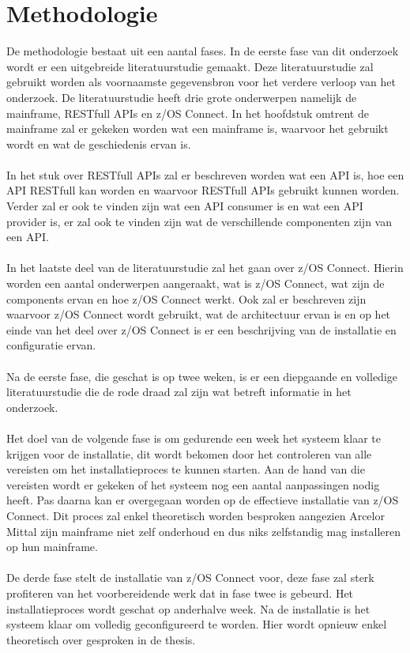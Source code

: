 \section{Methodologie}%
\label{sec:methodologie}
De methodologie bestaat uit een aantal fases. In de eerste fase van dit onderzoek wordt er een uitgebreide literatuurstudie gemaakt. Deze literatuurstudie zal gebruikt worden als voornaamste gegevensbron voor het verdere verloop van het onderzoek. De literatuurstudie heeft drie grote onderwerpen namelijk de mainframe, RESTfull APIs en z/OS Connect. In het hoofdstuk omtrent de mainframe zal er gekeken worden wat een mainframe is, waarvoor het gebruikt wordt en wat de geschiedenis ervan is.
\\ \\
In het stuk over RESTfull APIs zal er beschreven worden wat een API is, hoe een API RESTfull kan worden en waarvoor RESTfull APIs gebruikt kunnen worden. Verder zal er ook te vinden zijn wat een API consumer is en wat een API provider is, er zal ook te vinden zijn wat de verschillende componenten zijn van een API.
\\ \\
In het laatste deel van de literatuurstudie zal het gaan over z/OS Connect. Hierin worden een aantal onderwerpen aangeraakt, wat is z/OS Connect, wat zijn de components ervan en hoe z/OS Connect werkt. Ook zal er beschreven zijn waarvoor z/OS Connect wordt gebruikt, wat de architectuur ervan is en op het einde van het deel over z/OS Connect is er een beschrijving van de installatie en configuratie ervan.
\\ \\
Na de eerste fase, die geschat is op twee weken, is er een diepgaande en volledige literatuurstudie die de rode draad zal zijn wat betreft informatie in het onderzoek.
\\ \\
Het doel van de volgende fase is om gedurende een week het systeem klaar te krijgen voor de installatie, dit wordt bekomen door het controleren van alle vereisten om het installatieproces te kunnen starten. Aan de hand van die vereisten wordt er gekeken of het systeem nog een aantal aanpassingen nodig heeft. Pas daarna kan er overgegaan worden op de effectieve installatie van z/OS Connect. Dit proces zal enkel theoretisch worden besproken aangezien Arcelor Mittal zijn mainframe niet zelf onderhoud en dus niks zelfstandig mag installeren op hun mainframe.
\\ \\
De derde fase stelt de installatie van z/OS Connect voor, deze fase zal sterk profiteren van het voorbereidende werk dat in fase twee is gebeurd. Het installatieproces wordt geschat op anderhalve week. Na de installatie is het systeem klaar om volledig geconfigureerd te worden. Hier wordt opnieuw enkel theoretisch over gesproken in de thesis.
